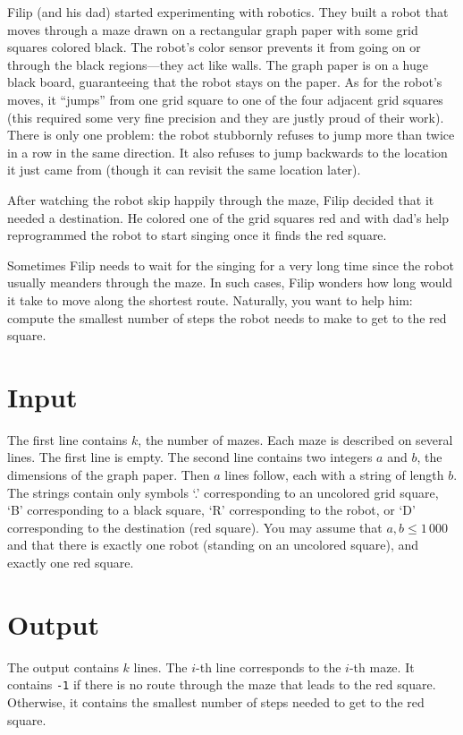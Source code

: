 
Filip (and his dad) started experimenting with robotics. They built a robot that moves through a maze drawn on a rectangular graph paper with some grid squares colored black. The robot's color sensor prevents it from going on or through the black regions---they act like walls. The graph paper is on a huge black board, guaranteeing that the robot stays on the paper. As for the robot's moves, it ``jumps'' from one grid square to one of the four adjacent grid squares (this required some very fine precision and they are justly proud of their work). There is only one problem: the robot stubbornly refuses to jump more than twice in a row in the same direction. It also refuses to jump backwards to the location it just came from (though it can revisit the same location later).

After watching the robot skip happily through the maze, Filip decided that it needed a destination. He colored one of the grid squares red and with dad's help reprogrammed the robot to start singing once it finds the red square.

Sometimes Filip needs to wait for the singing for a very long time since the robot usually meanders through the maze. In such cases, Filip wonders how long would it take to move along the shortest route. Naturally, you want to help him: compute the smallest number of steps the robot needs to make to get to the red square.


\section*{Input}
The first line contains $k$, the number of mazes.
Each maze is described on several lines. The first line is empty. The second line contains two
integers $a$ and $b$, the dimensions of the graph paper. Then $a$ lines follow, each with a string
of length $b$. The strings contain only symbols `.' corresponding to an uncolored grid square, `B'
corresponding to a black square, `R' corresponding to the robot, or `D' corresponding to the
destination (red square). You may assume that $a,b\leq 1\,000$ and that there is exactly one robot (standing on an uncolored square), and exactly one red square.


\section*{Output}
The output contains $k$ lines. The $i$-th line corresponds to the $i$-th maze.
It contains {\tt -1} if there is no route through the maze that leads to the red square.
Otherwise, it contains the smallest number of steps needed to get to the red square.


